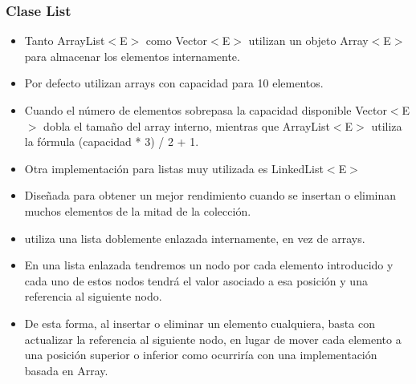 \documentclass{beamer}
\begin{document}
\begin{frame}
\frametitle{Clase List}
\begin{footnotesize}
\begin{itemize}[<+->]
\item Tanto ArrayList$<$E$>$ como Vector$<$E$>$ utilizan un objeto Array$<$E$>$ para almacenar los elementos internamente.
\item Por defecto utilizan arrays con capacidad para 10 elementos.
\item Cuando el número de elementos sobrepasa la capacidad disponible Vector$<$E$>$ dobla el tamaño del array interno, mientras que ArrayList$<$E$>$ utiliza la fórmula (capacidad * 3) / 2 + 1.
\item Otra implementación para listas muy utilizada es LinkedList$<$E$>$
\item Diseñada para obtener un mejor rendimiento cuando se insertan o eliminan muchos elementos de la mitad de la colección.
\item utiliza una lista doblemente enlazada internamente, en vez de arrays.
\item En una lista enlazada tendremos un nodo por cada elemento introducido y cada uno de estos nodos tendrá el valor asociado a esa posición y una referencia al siguiente nodo.
\item  De esta forma, al insertar o eliminar un elemento cualquiera, basta con actualizar la referencia al siguiente nodo, en lugar de mover cada elemento a una posición superior o inferior como ocurriría con una implementación basada en Array.
\end{itemize}
\end{footnotesize}

\end{frame}
\end{document}
